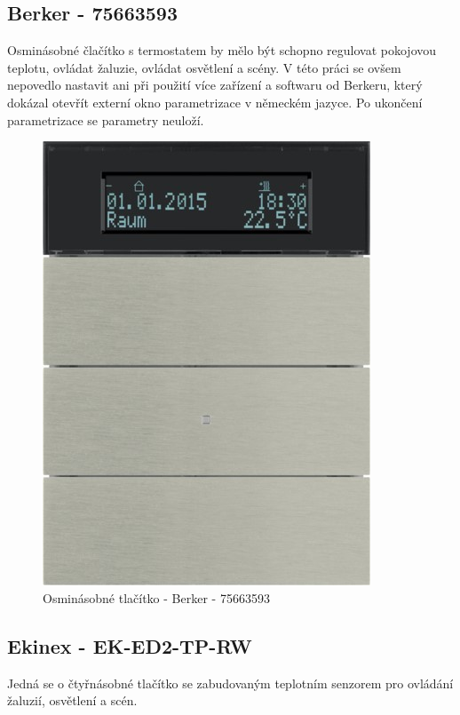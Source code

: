 \subsection{Berker - 75663593}
Osminásobné člačítko s termostatem by mělo být schopno regulovat pokojovou teplotu, ovládat žaluzie, ovládat osvětlení a scény. V této práci se ovšem nepovedlo nastavit ani při použití více zařízení a softwaru od Berkeru, který dokázal otevřít externí okno parametrizace v německém jazyce. Po ukončení parametrizace se parametry neuloží. \cite{Berker}
\begin{figure}[!ht]
  \begin{center}
    \includegraphics[scale=1.3]{obrazky/Berker.jpg}
  \end{center}
  \caption[Osminásobné tlačítko Berker - 75663593 \cite{Berker}]{Osminásobné tlačítko - Berker - 75663593 \cite{Berker}}
  \label{fig:Osminásobné člačítko s termostatem Berker 75663593}
\end{figure}
\newpage
\subsection{Ekinex - EK-ED2-TP-RW}
Jedná se o čtyřnásobné tlačítko se zabudovaným teplotním senzorem pro ovládání žaluzií, osvětlení a scén. \cite{Ekinex}

